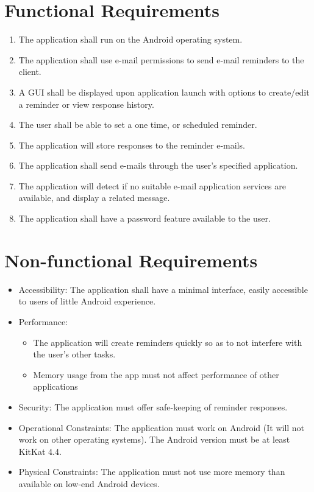 \documentclass[12pt, titlepage, a4paper]{article}
\begin{document}
\section{Functional Requirements}
\begin{enumerate}
    \item The application shall run on the Android operating system.
    \item The application shall use e-mail permissions to send e-mail reminders to the client.
    \item A GUI shall be displayed upon application launch with options  to create/edit a reminder or view response history.
    \item The user shall be able to set a one time, or scheduled reminder.
    \item The application will store responses to the reminder e-mails.
    \item The application shall send e-mails through the user's specified application.
    \item The application will detect if no suitable e-mail application services are available, and display a related message.
    \item The application shall have a password feature available to the user.
\end{enumerate}

\section{Non-functional Requirements}
\begin{itemize}
    \item Accessibility: The application shall have a minimal interface, easily accessible to users of little Android experience.
    \item Performance: 
    \begin{itemize}
        \item The application will create reminders quickly so as to not interfere with the user's other tasks. 
        \item Memory usage from the app must not affect performance of other applications
    \end{itemize}
    \item Security: The application must offer safe-keeping of reminder responses.
    \item Operational Constraints: The application must work on Android (It will not work on other operating systems). The Android version must be at least KitKat 4.4.
    \item Physical Constraints: The application must not use more memory than available on low-end Android devices.
\end{itemize}
\end{document}
